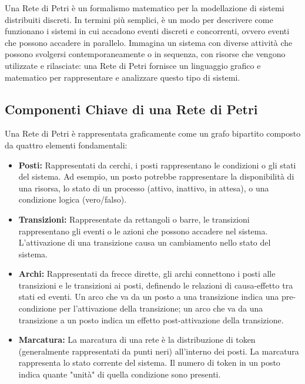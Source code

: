 Una Rete di Petri è un formalismo matematico per la modellazione di sistemi
distribuiti discreti. In termini più semplici, è un modo per descrivere come
funzionano i sistemi in cui accadono eventi discreti e concorrenti, ovvero
eventi che possono accadere in parallelo. Immagina un sistema con diverse
attività che possono svolgersi contemporaneamente o in sequenza, con risorse
che vengono utilizzate e rilasciate: una Rete di Petri fornisce un linguaggio
grafico e matematico per rappresentare e analizzare questo tipo di sistemi.

\subsection{Componenti Chiave di una Rete di Petri}
Una Rete di Petri è rappresentata graficamente come un grafo bipartito composto
da quattro elementi fondamentali:
\begin{itemize}
    \item \textbf{Posti:} Rappresentati da cerchi, i posti rappresentano le
          condizioni o gli stati del sistema. Ad esempio, un posto potrebbe
          rappresentare la disponibilità di una risorsa, lo stato di un processo
          (attivo, inattivo, in attesa), o una condizione logica (vero/falso).
    \item \textbf{Transizioni:} Rappresentate da rettangoli o barre,
          le transizioni rappresentano gli eventi o le azioni che possono
          accadere nel sistema. L'attivazione di una transizione causa un
          cambiamento nello stato del sistema.
    \item \textbf{Archi:} Rappresentati da frecce dirette, gli archi connettono
          i posti alle transizioni e le transizioni ai posti, definendo le
          relazioni di causa-effetto tra stati ed eventi. Un arco che va da un posto a
          una transizione indica una pre-condizione per l'attivazione della transizione;
          un arco che va da una transizione a un posto indica un effetto post-attivazione
          della transizione.
    \item \textbf{Marcatura:} La marcatura di una rete è la distribuzione di
          token (generalmente rappresentati da punti neri) all'interno dei posti.
          La marcatura rappresenta lo stato corrente del sistema. Il numero di
          token in un posto indica quante "unità" di quella condizione sono presenti.
\end{itemize}

